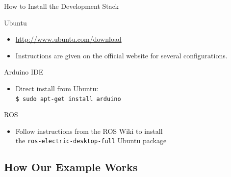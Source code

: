   \begin{frame}{How to Install the Development Stack}
    \begin{block}{Ubuntu}
      \begin{itemize}
       \item \url{http://www.ubuntu.com/download}
       \item Instructions are given on the official website for several configurations.
      \end{itemize}
    \end{block}
    \begin{block}{Arduino IDE}
      \begin{itemize}
       \item Direct install from Ubuntu:\\
             \texttt{\$ sudo apt-get install \alert{arduino}}
      \end{itemize}
    \end{block}
    \begin{block}{ROS}
      \begin{itemize}
       \item Follow instructions from the ROS Wiki to install\\
             the \alert{\texttt{ros-electric-desktop-full}} Ubuntu package 
      \end{itemize}
    \end{block}
  \end{frame}

%
\subsection{How Our Example Works}

